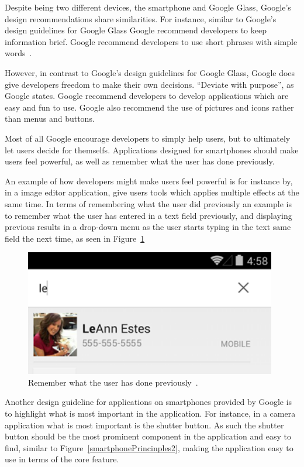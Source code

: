 Despite being two different devices, the smartphone and Google Glass, Google's design recommendations share similarities. For instance, similar to Google's design guidelines for Google Glass Google recommend developers to keep information brief. Google recommend developers to use short phrases with simple words~\cite{androidDesignPrinciples}.

However, in contrast to Google's design guidelines for Google Glass, Google does give developers freedom to make their own decisions. ``Deviate with purpose'', as Google states. Google recommend developers to develop applications which are easy and fun to use. Google also recommend the use of pictures and icons rather than menus and buttons.

Most of all Google encourage developers to simply help users, but to ultimately let users decide for themselfs. Applications designed for smartphones should make users feel powerful, as well as remember what the user has done previously.

An example of how developers might make users feel powerful is for instance by, in a image editor application, give users tools which applies multiple effects at the same time. In terms of remembering what the user did previously an example is to remember what the user has entered in a text field previously, and displaying previous results in a drop-down menu as the user starts typing in the text same field the next time, as seen in Figure~\ref{smartphonePrinciples1}

	\begin{figure}[ht!]
		\centering
		\includegraphics[width=110mm]{images/principles_get_to_know_me}
		\caption{Remember what the user has done previously~\cite{androidDesignPrinciples}.}
		\label{smartphonePrinciples1}
	\end{figure}

Another design guideline for applications on smartphones provided by Google is to highlight what is most important in the application. For instance, in a camera application what is most important is the shutter button. As such the shutter button should be the most prominent component in the application and easy to find, similar to Figure~\ref{smartphonePrincinples2}, making the application easy to use in terms of the core feature.

